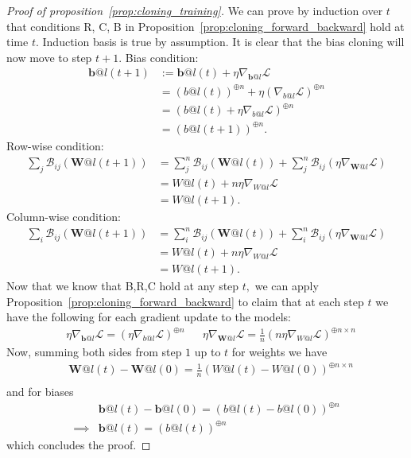 \documentclass{article}
\newcommand{\1}{\mathbf{1}}
\newcommand{\Loss}{\mathcal{L}}
\newcommand{\R}[2]{\mathcal{R}_{#2}(#1)}
\renewcommand{\R}[2]{({#1})^{\oplus #2}}
\newcommand{\bl}[2]{\mathcal{B}_{#2}({#1})}
\newcommand{\B}[1]{\boldsymbol{#1}}
\begin{document}
\begin{proof}[Proof of proposition~\ref{prop:cloning_training}]
    We can prove by induction over $t$ that conditions R, C, B in Proposition~\ref{prop:cloning_forward_backward} hold at time $t.$ Induction basis is true by assumption. 
    It is clear that the bias cloning will now move to step $t+1$. 
    Bias condition:
    \begin{align*}
        \B b@l(t+1)&:= \B b @l(t) +\eta \nabla_{\B b@l}\Loss\\
        &= \R{b@l(t)}{n} + \eta \R{\nabla_{b@l}\Loss}{n}\\
        &=\R{b@l(t) +\eta \nabla_{b@l}\Loss}{n}\\
        &= \R{b@l(t+1)}{n}.
    \end{align*}
    Row-wise condition:
    \begin{align*}
        \sum_{j}\bl{\B W@l(t+1)}{ij} &= \sum_{j}^n\bl{\B W@l(t)}{ij} + \sum_{j}^n\bl{\eta \nabla_{\B W@l}\Loss}{ij}\\
        &= W@l(t) + n \eta \nabla_{W@l}\Loss \\
        &= W@l(t+1).
    \end{align*}
    Column-wise condition:
    \begin{align*}
        \sum_{i}\bl{\B W@l(t+1)}{ij} &= \sum_{i}^n\bl{\B W@l(t)}{ij} + \sum_{i}^n\bl{\eta \nabla_{\B W@l}\Loss}{ij}\\
        &= W@l(t) + n \eta \nabla_{W@l}\Loss \\
        &= W@l(t+1).
    \end{align*}
    Now that we know that B,R,C hold at any step $t,$ we can apply Proposition~\ref{prop:cloning_forward_backward} to claim that at each step $t$ we have the following for each gradient update to the models:
    \begin{align*}
        &\eta \nabla_{\B b@l}\Loss = \R{\eta \nabla_{b@l}\Loss}{n} &&\eta \nabla_{\B W@l}\Loss = \frac1n\R{n\eta \nabla_{W@l}\Loss}{n\times n}
    \end{align*}
    Now, summing both sides from step $1$ up to $t$ for weights we have 
    \begin{align*}
        &\B W@l(t)-\B W@l(0) =  \frac1n \R{W@l(t)- W@l(0)}{n\times n}\\
    \end{align*}
    and for biases 
    \begin{align*}
        &\B b@l(t)-\B b@l(0) =  \R{b@l(t)- b@l(0)}{n}\\
       \implies &\B b@l(t) =  \R{b@l(t)}{n}
    \end{align*}
    which concludes the proof.
\end{proof}
\end{document}
